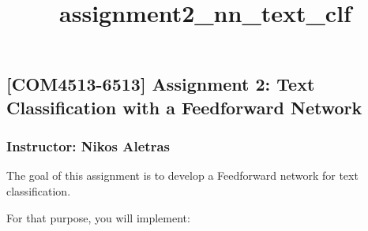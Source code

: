 \documentclass[11pt]{article}
\title{assignment2\_nn\_text\_clf}
\begin{document}
    \maketitle




    \hypertarget{com4513-6513-assignment-2-text-classification-with-a-feedforward-network}{%
\subsection{{[}COM4513-6513{]} Assignment 2: Text Classification with a
Feedforward
Network}\label{com4513-6513-assignment-2-text-classification-with-a-feedforward-network}}

\hypertarget{instructor-nikos-aletras}{%
\subsubsection{Instructor: Nikos
Aletras}\label{instructor-nikos-aletras}}

The goal of this assignment is to develop a Feedforward network for text
classification.

For that purpose, you will implement:
\end{document}
